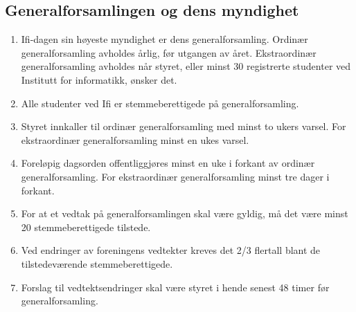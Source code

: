 \documentclass[norsk,a4paper]{article}
\providecommand{\DIFaddbegin}{} %
\providecommand{\DIFaddend}{} %
\providecommand{\DIFdelbegin}{} %
\providecommand{\DIFdelend}{} %
\newcommand{\DIFscaledelfig}{0.5}
\newlength{\DIFdelgraphicswidth} %
\newlength{\DIFdelgraphicsheight} %
\newcommand{\DIFaddincludegraphics}[2][]{{\color{blue}\fbox{\DIFOincludegraphics[#1]{#2}}}} %
\newcommand{\DIFdelincludegraphics}[2][]{%
\sbox{\DIFdelgraphicsbox}{\DIFOincludegraphics[#1]{#2}}%
\settoboxwidth{\DIFdelgraphicswidth}{\DIFdelgraphicsbox} %
\settoboxtotalheight{\DIFdelgraphicsheight}{\DIFdelgraphicsbox} %
\scalebox{\DIFscaledelfig}{%
\parbox[b]{\DIFdelgraphicswidth}{\usebox{\DIFdelgraphicsbox}\\[-\baselineskip] \rule{\DIFdelgraphicswidth}{0em}}\llap{\resizebox{\DIFdelgraphicswidth}{\DIFdelgraphicsheight}{%
\setlength{\unitlength}{\DIFdelgraphicswidth}%
\begin{picture}(1,1)%
\thicklines\linethickness{2pt} %
{\color[rgb]{1,0,0}\put(0,0){\framebox(1,1){}}}%
{\color[rgb]{1,0,0}\put(0,0){\line( 1,1){1}}}%
{\color[rgb]{1,0,0}\put(0,1){\line(1,-1){1}}}%
\end{picture}%
}\hspace*{3pt}}} %
} %
\DeclareRobustCommand{\DIFaddbegin}{\DIFOaddbegin \let\includegraphics\DIFaddincludegraphics} %
\DeclareRobustCommand{\DIFaddend}{\DIFOaddend \let\includegraphics\DIFOincludegraphics} %
\DeclareRobustCommand{\DIFdelbegin}{\DIFOdelbegin \let\includegraphics\DIFdelincludegraphics} %
\DeclareRobustCommand{\DIFdelend}{\DIFOaddend \let\includegraphics\DIFOincludegraphics} %
\begin{document}
\subsection{Generalforsamlingen og dens myndighet}
\begin{enumerate}
	\DIFdelbegin %
\DIFdelend \DIFaddbegin \item{Ifi-dagen sin høyeste myndighet er dens generalforsamling. Ordinær generalforsamling avholdes årlig, før utgangen av året. Ekstraordinær generalforsamling avholdes når styret, eller minst 30 registrerte studenter ved Institutt for informatikk, ønsker det.}
	\DIFaddend \item{Alle studenter ved Ifi er stemmeberettigede på generalforsamling.}
	\item{Styret innkaller til ordinær generalforsamling med minst to ukers varsel. For ekstraordinær generalforsamling minst en ukes varsel.}
	\item{Foreløpig dagsorden offentliggjøres minst en uke i forkant av ordinær generalforsamling. For ekstraordinær generalforsamling minst tre dager i forkant.}
	\item{For at et vedtak på generalforsamlingen skal være gyldig, må det være minst 20 stemmeberettigede tilstede.}
	\item{Ved endringer av foreningens vedtekter kreves det 2/3 flertall blant de tilstedeværende stemmeberettigede.}
	\item{Forslag til vedtektsendringer skal være styret i hende senest 48 timer før generalforsamling.}
\end{enumerate}
\DIFaddbegin 
\end{document}
